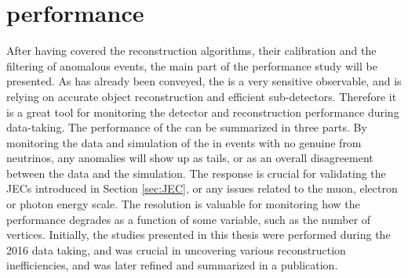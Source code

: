 \section{\ptmiss performance}
\noindent\justify
After having covered the \ptmiss reconstruction algorithms, their calibration and the filtering of anomalous \ptmiss events, the main part of the performance study will be presented. 
As has already been conveyed, the \ptmiss is a very sensitive observable, and is relying on accurate object reconstruction and efficient sub-detectors. 
Therefore it is a great tool for monitoring the detector and reconstruction performance during data-taking. 
The performance of the \ptmiss can be summarized in three parts. 
By monitoring the data and simulation of the \ptmiss in events with no genuine \ptmiss from neutrinos, any anomalies will show up as \ptmiss tails, or as an overall disagreement between the data and the simulation. 
The \ptmiss response is crucial for validating the JECs introduced in Section \ref{sec:JEC}, or any issues related to the muon, electron or photon energy scale.  
The \ptmiss resolution is valuable for monitoring how the performance degrades as a function of some variable, such as the number of vertices. 
Initially, the studies presented in this thesis were performed during the 2016 data taking, and was crucial in uncovering various reconstruction inefficiencies, and was later refined and summarized in a publication.  

